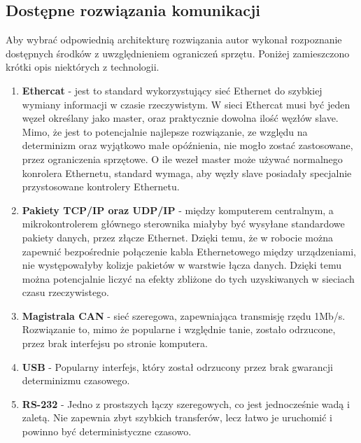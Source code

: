 \documentclass[10pt,a4paper]{article}
\begin{document}
	\subsection{Dostępne rozwiązania komunikacji}
	Aby wybrać odpowiednią architekturę rozwiązania autor wykonał rozpoznanie dostępnych środków z uwzględnieniem ograniczeń sprzętu. Poniżej zamieszczono krótki opis niektórych z technologii.
	\begin{enumerate}
		\item \textbf{Ethercat} - jest to standard wykorzystujący sieć Ethernet do szybkiej wymiany informacji w czasie rzeczywistym. W sieci Ethercat musi być jeden węzeł określany jako master, oraz praktycznie dowolna ilość węzłów slave. Mimo, że jest to potencjalnie najlepsze rozwiązanie, ze względu na determinizm oraz wyjątkowo małe opóźnienia, nie mogło zostać zastosowane, przez ograniczenia sprzętowe. O ile wezeł master może używać normalnego konrolera Ethernetu, standard wymaga, aby węzły slave posiadały specjalnie przystosowane kontrolery Ethernetu.
		\item \textbf{Pakiety TCP/IP oraz UDP/IP} - między komputerem centralnym, a mikrokontrolerem głównego sterownika miałyby być wysyłane standardowe pakiety danych, przez złącze Ethernet. Dzięki temu, że w robocie można zapewnić bezpośrednie połączenie kabla Ethernetowego między urządzeniami, nie występowałyby kolizje pakietów w warstwie łącza danych. Dzięki temu można potencjalnie liczyć na efekty zbliżone do tych uzyskiwanych w sieciach czasu rzeczywistego.
		\item \textbf{Magistrala CAN} - sieć szeregowa, zapewniająca transmisję rzędu 1Mb/s. Rozwiązanie to, mimo że popularne i względnie tanie, zostało odrzucone, przez brak interfejsu po stronie komputera.
		\item \textbf{USB} - Popularny interfejs, który został odrzucony przez brak gwarancji determinizmu czasowego.
		\item \textbf{RS-232} - Jedno z prostszych łączy szeregowych, co jest jednocześnie wadą i zaletą. Nie zapewnia zbyt szybkich transferów, lecz łatwo je uruchomić i powinno być deterministyczne czasowo.
	\end{enumerate}
\end{document}
